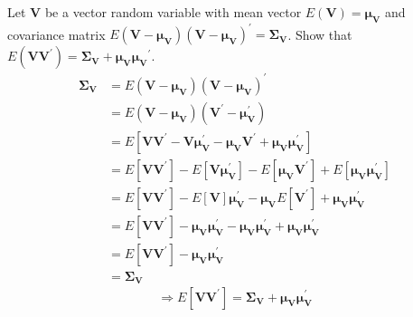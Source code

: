 Let $\textbf{V}$ be a vector random variable with mean vector $E(\textbf{V}) = \bm{\mu}_{\textbf{V}}$ and covariance matrix $E(\textbf{V}-\bm{\mu}_{\textbf{V}}){(\textbf{V}-\bm{\mu}_{\textbf{V}})}^{\prime} = \bm{\Sigma}_{\textbf{V}}$. Show that $E(\textbf{V}{\textbf{V}}^{\prime}) = \bm{\Sigma}_{\textbf{V}} + \bm{\mu}_{\textbf{V}}{\bm{\mu}_{\textbf{V}}}^{\prime}$.
\begin{align*}
    \bm{\Sigma}_{\textbf{V}}
    & =
    E(\textbf{V}-\bm{\mu}_{\textbf{V}}){(\textbf{V}-\bm{\mu}_{\textbf{V}})}^{\prime} \\
    & =
    E(\textbf{V}-\bm{\mu}_{\textbf{V}})(\textbf{V}^{\prime}-\bm{\mu}_{\textbf{V}}^{\prime}) \\
    & =
    E
    \left[
        \textbf{V}
        \textbf{V}^{\prime}
        -
        \textbf{V}
        \bm{\mu}_{\textbf{V}}^{\prime}
        -
        \bm{\mu}_{\textbf{V}}
        \textbf{V}^{\prime}
        +
        \bm{\mu}_{\textbf{V}}
        \bm{\mu}_{\textbf{V}}^{\prime}
    \right] \\
    & =
    E \left[
        \textbf{V}
        \textbf{V}^{\prime}
    \right]
    -
    E \left[
        \textbf{V}
        \bm{\mu}_{\textbf{V}}^{\prime}
    \right]
    -
    E \left[
        \bm{\mu}_{\textbf{V}}
        \textbf{V}^{\prime}
    \right]
    +
    E \left[
        \bm{\mu}_{\textbf{V}}
        \bm{\mu}_{\textbf{V}}^{\prime}
    \right] \\
    & =
    E \left[
        \textbf{V}
        \textbf{V}^{\prime}
    \right]
    -
    E \left[
        \textbf{V}
    \right]
    \bm{\mu}_{\textbf{V}}^{\prime}
    -
    \bm{\mu}_{\textbf{V}}
    E \left[
        \textbf{V}^{\prime}
    \right]
    +
    \bm{\mu}_{\textbf{V}}
    \bm{\mu}_{\textbf{V}}^{\prime} \\
    & =
    E \left[
        \textbf{V}
        \textbf{V}^{\prime}
    \right]
    -
    \bm{\mu}_{\textbf{V}}
    \bm{\mu}_{\textbf{V}}^{\prime}
    -
    \bm{\mu}_{\textbf{V}}
    \bm{\mu}_{\textbf{V}}^{\prime}
    +
    \bm{\mu}_{\textbf{V}}
    \bm{\mu}_{\textbf{V}}^{\prime} \\
    & =
    E \left[
        \textbf{V}
        \textbf{V}^{\prime}
    \right]
    -
    \bm{\mu}_{\textbf{V}}
    \bm{\mu}_{\textbf{V}}^{\prime} \\
    & =
    \bm{\Sigma}_{\textbf{V}}
\end{align*}
\[
    \Rightarrow
    E \left[
        \textbf{V}
        \textbf{V}^{\prime}
    \right]
    =
    \bm{\Sigma}_{\textbf{V}}
    +
    \bm{\mu}_{\textbf{V}}
    \bm{\mu}_{\textbf{V}}^{\prime}
\]